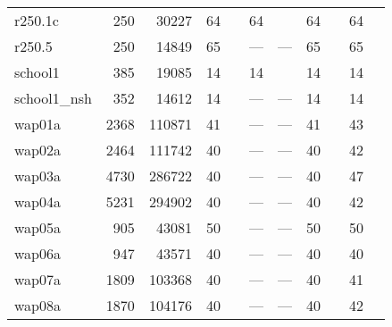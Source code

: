 \begin{table}[t]
\begin{tabular}{lrrrlrlrlrl}
  r250.1c & 250 & 30227 & 64 & \cite{us} & 64 & \cite{us} & 64 & \cite{Malaguti2010,Gualandi2012} & 64 & \cite{Zhou2016,Morgenstern1996,BlochligerI.andZufferey2004,FunabikiNobuoandHigashino2000,Malaguti2008,Zhou2018,Gualandi2012} \\ 
  r250.5 & 250 & 14849 & 65 & \cite{us} & --- & --- & 65 & \cite{Malaguti2010,Gualandi2012} & 65 & \cite{Morgenstern1996,FunabikiNobuoandHigashino2000,Malaguti2008,Porumbel2010,Lu2010,Titiloye2011,Moalic2015,Gualandi2012} \\ 
  school1 & 385 & 19085 & 14 & \cite{Malaguti2011,Gualandi2012} & 14 & \cite{Gualandi2012} & 14 & \cite{Mendez-Diaz2006,Mendez-Diaz2006,Gualandi2012,Malaguti2011} & 14 & \cite{Zhou2016,Mendez-Diaz2006,Malaguti2011,Zhou2018,Gualandi2012,Mendez-Diaz2006,Brelaz1979,Sewell1996,Segundo2012} \\ 
  school1\_nsh & 352 & 14612 & 14 & \cite{us} & --- & --- & 14 & \cite{Mendez-Diaz2006,Mendez-Diaz2006,Malaguti2011} & 14 & \cite{Zhou2016,Mendez-Diaz2006,Malaguti2011,Zhou2018,Mendez-Diaz2006,Brelaz1979,Sewell1996,Segundo2012} \\ 
  wap01a & 2368 & 110871 & 41 & \cite{Held2011} & --- & --- & 41 & \cite{Mendez-Diaz2006,Held2011} & 43 & \cite{Malaguti2011} \\ 
  wap02a & 2464 & 111742 & 40 & \cite{Held2011,Malaguti2011} & --- & --- & 40 & \cite{Mendez-Diaz2006,Held2011} & 42 & \cite{Malaguti2011} \\ 
  wap03a & 4730 & 286722 & 40 & \cite{Held2011,Malaguti2011} & --- & --- & 40 & \cite{Mendez-Diaz2006} & 47 & \cite{Malaguti2011} \\ 
  wap04a & 5231 & 294902 & 40 & \cite{Held2011,Malaguti2011} & --- & --- & 40 & \cite{Mendez-Diaz2006} & 42 & \cite{Hao2012} \\ 
  wap05a & 905 & 43081 & 50 & \cite{us} & --- & --- & 50 & \cite{Mendez-Diaz2006,Malaguti2011} & 50 & \cite{Malaguti2011,Wu2013a,Brelaz1979,Sewell1996,Segundo2012,Mendez-Diaz2006} \\ 
  wap06a & 947 & 43571 & 40 & \cite{Held2011,Malaguti2011} & --- & --- & 40 & \cite{Mendez-Diaz2006,Held2011} & 40 & \cite{Malaguti2011} \\ 
  wap07a & 1809 & 103368 & 40 & \cite{Held2011,Malaguti2011} & --- & --- & 40 & \cite{Mendez-Diaz2006,Held2011,Malaguti2011} & 41 & \cite{Hao2012} \\ 
  wap08a & 1870 & 104176 & 40 & \cite{Held2011,Malaguti2011} & --- & --- & 40 & \cite{Mendez-Diaz2006,Held2011,Malaguti2011} & 42 & \cite{Malaguti2011} \\ 

\end{tabular}
\end{table}
